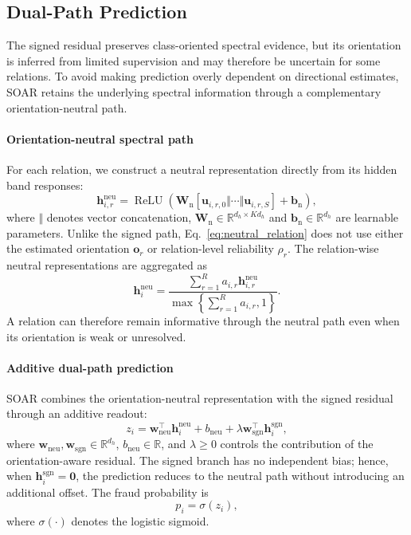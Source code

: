 \documentclass[10pt,journal]{IEEEtran}
\begin{document}
\subsection{Dual-Path Prediction}
\label{sec:dual}

The signed residual preserves class-oriented spectral evidence, but its
orientation is inferred from limited supervision and may therefore be
uncertain for some relations. To avoid making prediction overly dependent
on directional estimates, SOAR retains the underlying spectral information
through a complementary orientation-neutral path.

\paragraph{Orientation-neutral spectral path}
For each relation, we construct a neutral representation directly from its
hidden band responses:
\begin{equation}
\mathbf{h}^{\mathrm{neu}}_{i,r}
=
\operatorname{ReLU}
\left(
\mathbf{W}_{\mathrm n}
[
\mathbf{u}_{i,r,0}
\Vert\cdots\Vert
\mathbf{u}_{i,r,S}
]
+
\mathbf{b}_{\mathrm n}
\right),
\label{eq:neutral_relation}
\end{equation}
where $\Vert$ denotes vector concatenation,
$\mathbf{W}_{\mathrm n}\in\mathbb{R}^{d_h\times Kd_h}$ and
$\mathbf{b}_{\mathrm n}\in\mathbb{R}^{d_h}$ are learnable parameters.
Unlike the signed path, Eq.~\eqref{eq:neutral_relation} does not use either
the estimated orientation $\mathbf{o}_r$ or relation-level reliability
$\rho_r$. The relation-wise neutral representations are aggregated as
\begin{equation}
\mathbf{h}^{\mathrm{neu}}_i
=
\frac{
\sum_{r=1}^{R}
a_{i,r}\mathbf{h}^{\mathrm{neu}}_{i,r}
}{
\max\left\{
\sum_{r=1}^{R}a_{i,r},
1
\right\}
}.
\label{eq:neutral_fusion}
\end{equation}
A relation can therefore remain informative through the neutral path even
when its orientation is weak or unresolved.

\paragraph{Additive dual-path prediction}
SOAR combines the orientation-neutral representation with the signed residual
through an additive readout:
\begin{equation}
z_i
=
\mathbf{w}_{\mathrm{neu}}^{\top}
\mathbf{h}^{\mathrm{neu}}_i
+
b_{\mathrm{neu}}
+
\lambda
\mathbf{w}_{\mathrm{sgn}}^{\top}
\mathbf{h}^{\mathrm{sgn}}_i,
\label{eq:dual_logit}
\end{equation}
where
$\mathbf{w}_{\mathrm{neu}},\mathbf{w}_{\mathrm{sgn}}
\in\mathbb{R}^{d_h}$,
$b_{\mathrm{neu}}\in\mathbb{R}$,
and $\lambda\ge0$ controls the contribution of the orientation-aware
residual. The signed branch has no independent bias; hence, when
$\mathbf{h}^{\mathrm{sgn}}_i=\mathbf{0}$, the prediction reduces to the
neutral path without introducing an additional offset. The fraud
probability is
\begin{equation}
p_i
=
\sigma(z_i),
\label{eq:probability}
\end{equation}
where $\sigma(\cdot)$ denotes the logistic sigmoid.
\end{document}

